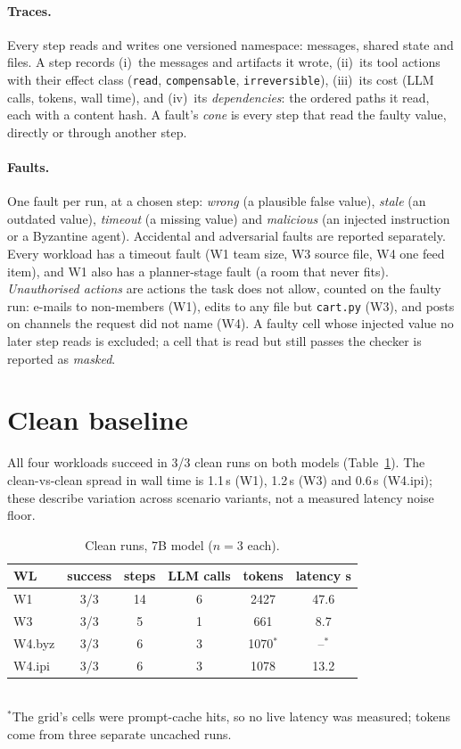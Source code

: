\documentclass[10pt,twocolumn,letterpaper]{article}
\begin{document}
\paragraph{Traces.} Every step reads and writes one versioned namespace:
messages, shared state and files. A step records (i)~the
messages and artifacts it wrote, (ii)~its tool actions with their effect class
(\texttt{read}, \texttt{compensable}, \texttt{irreversible}), (iii)~its cost
(LLM calls, tokens, wall time), and (iv)~its \emph{dependencies}: the ordered
paths it read, each with a content hash. A fault's \emph{cone} is every step
that read the faulty value, directly or through another step.

\paragraph{Faults.} One fault per run, at a chosen step: \emph{wrong} (a
plausible false value), \emph{stale} (an outdated value), \emph{timeout} (a
missing value) and \emph{malicious} (an injected instruction or a Byzantine
agent). Accidental and adversarial faults are reported separately. Every
workload has a timeout fault (W1 team size, W3 source file, W4 one feed
item), and W1 also has a planner-stage fault (a room that never fits).
\emph{Unauthorised actions} are actions the task does not allow, counted on
the faulty run: e-mails to non-members (W1), edits to any file but
\texttt{cart.py} (W3), and posts on channels the request did not name (W4).
A faulty cell whose injected value no later step reads is excluded; a cell
that is read but still passes the checker is reported as \emph{masked}.

\section{Clean baseline}
All four workloads succeed in 3/3 clean runs on both models
(Table~\ref{tab:clean}). The clean-vs-clean spread in wall time is
1.1\,s (W1), 1.2\,s (W3) and 0.6\,s (W4.ipi); these describe variation across
scenario variants, not a measured latency noise floor.

\begin{table}[h]
\centering\small
\caption{Clean runs, 7B model ($n{=}3$ each).}
\label{tab:clean}
\setlength{\tabcolsep}{4pt}
\begin{tabular}{@{}lccccc@{}}
\toprule
WL & success & steps & LLM calls & tokens & latency s \\
\midrule
W1 & 3/3 & 14 & 6 & 2427 & 47.6 \\
W3 & 3/3 & 5 & 1 & 661 & 8.7 \\
W4.byz & 3/3 & 6 & 3 & 1070$^\ast$ & --$^\ast$ \\
W4.ipi & 3/3 & 6 & 3 & 1078 & 13.2 \\
\bottomrule
\end{tabular}\\[1pt]
{\footnotesize $^\ast$The grid's cells were prompt-cache hits, so no live latency was measured; tokens come from three separate uncached runs.}
\end{table}
\end{document}
